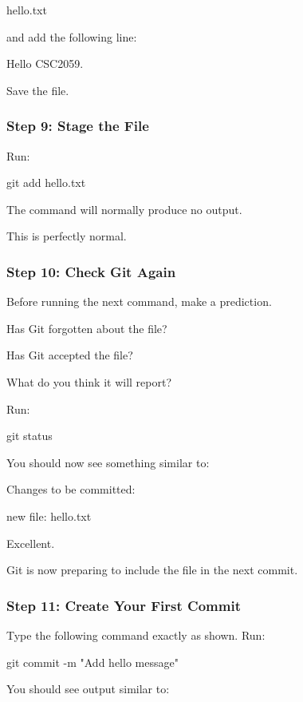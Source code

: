 \documentclass{csc2059practical}
\begin{document}
\begin{terminalplain}
hello.txt
\end{terminalplain}
and add the following line:

\begin{terminalplain}
Hello CSC2059.
\end{terminalplain}
Save the file.

\subsubsection{Step 9: Stage the File}
Run:

\begin{terminalplain}
git add hello.txt
\end{terminalplain}
The command will normally produce no output.

This is perfectly normal.

\subsubsection{Step 10: Check Git Again}
Before running the next command, make a prediction.

Has Git forgotten about the file?

Has Git accepted the file?

What do you think it will report?

Run:

\begin{terminalplain}
git status
\end{terminalplain}
You should now see something similar to:

\begin{terminalplain}
Changes to be committed:
\end{terminalplain}
\begin{terminalplain}
new file: hello.txt
\end{terminalplain}
Excellent.

Git is now preparing to include the file in the next commit.

\subsubsection{Step 11: Create Your First Commit}
Type the following command exactly as shown. Run:

\begin{terminalplain}
git commit -m "Add hello message"
\end{terminalplain}
You should see output similar to:
\end{document}
